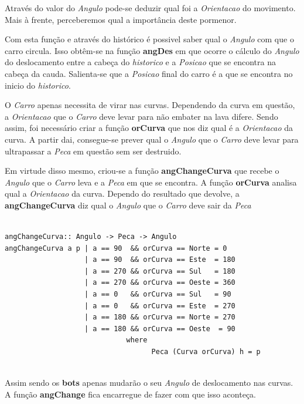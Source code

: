 \documentclass[a4paper]{report} %
\begin{document}
Através do valor do \emph{Angulo} pode-se deduzir qual foi a \emph{Orientacao} do movimento. Mais à frente, perceberemos qual a importância deste pormenor.

Com esta função e através do histórico é possivel saber qual o \emph{Angulo} com que o carro circula. Isso obtêm-se na função \textbf{angDes} em que ocorre o cálculo do \emph{Angulo} do deslocamento entre a cabeça do \emph{historico} e a \emph{Posicao} que se encontra na cabeça da cauda. Salienta-se que a \emph{Posicao} final do carro é a que se encontra no inicio do \emph{historico}.

O \emph{Carro} apenas necessita de virar nas curvas. Dependendo da curva em questão, a \emph{Orientacao} que o \emph{Carro} deve levar para não embater na lava difere. Sendo assim, foi necessário criar a função \textbf{orCurva} que nos diz qual é a \emph{Orientacao} da curva. A partir dai, consegue-se prever qual o \emph{Angulo} que o \emph{Carro} deve levar para ultrapassar a \emph{Peca} em questão sem ser destruido.

Em virtude disso mesmo, criou-se a função \textbf{angChangeCurva} que recebe o \emph{Angulo} que o \emph{Carro} leva e a \emph{Peca} em que se encontra. A função \textbf{orCurva} analisa qual a \emph{Orientacao} da curva. Dependo do resultado que devolve, a \textbf{angChangeCurva} diz qual o \emph{Angulo} que o \emph{Carro} deve sair da \emph{Peca}

\newpage

\scriptsize
\begin{verbatim}

angChangeCurva:: Angulo -> Peca -> Angulo
angChangeCurva a p | a == 90  && orCurva == Norte = 0
                   | a == 90  && orCurva == Este  = 180
                   | a == 270 && orCurva == Sul   = 180
                   | a == 270 && orCurva == Oeste = 360
                   | a == 0   && orCurva == Sul   = 90
                   | a == 0   && orCurva == Este  = 270
                   | a == 180 && orCurva == Norte = 270
                   | a == 180 && orCurva == Oeste  = 90
                             where
                                   Peca (Curva orCurva) h = p  


\end{verbatim}

\normalsize

Assim sendo os \textbf{bots} apenas mudarão o seu \emph{Angulo} de deslocamento nas curvas. A função \textbf{angChange} fica encarregue de fazer com que isso aconteça.
\end{document}
